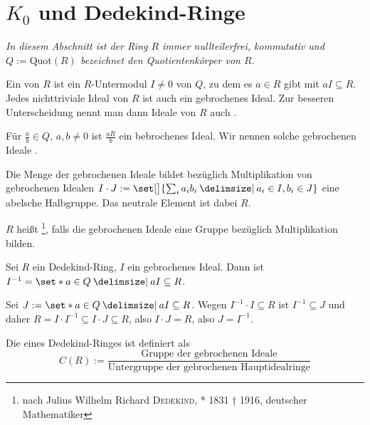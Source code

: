 \section{$K_0$ und Dedekind-Ringe} %
\label{sec:2}
\emph{In diesem Abschnitt ist der Ring $R$ immer nullteilerfrei, kommutativ und $Q := \mathrm{Quot}(R)$ bezeichnet den Quotientenkörper von $R$.}

\begin{definition}[{name=[{gebrochenes Ideal}]}]
	Ein  von $R$ ist ein $R$-Untermodul $I \neq 0$ von $Q$, zu dem es $a \in R$ gibt mit $a I \subseteq R$.
	Jedes nichttriviale Ideal von $R$ ist auch ein gebrochenes Ideal.
	Zur besseren Unterscheidung nennt man dann Ideale von $R$ auch .
	
	Für $\frac{a}{b} \in Q$, $a,b\neq 0$ ist $\frac{a R}{b}$ ein bebrochenes Ideal.
	Wir nennen solche gebrochenen Ideale .
\end{definition}

\begin{bemerkung}[{name=[{algebraische Struktur auf Menge der gebrochenen Ideale}]}]
	Die Menge der gebrochenen Ideale bildet bezüglich Multiplikation von gebrochenen Idealen $I \cdot J := \set[\big]{\sum_{i} a_i b_i \given a_i \in I, b_i \in J}$ eine abelsche Halbgruppe. 
	Das neutrale Element ist dabei $R$.
\end{bemerkung}

\begin{definition}[{name=[{Dedekind-Ring}]}]
	$R$ heißt \footnote{nach Julius Wilhelm Richard \textsc{Dedekind}, * 1831 † 1916, deutscher Mathematiker}, falls die gebrochenen Ideale eine Gruppe bezüglich Multiplikation bilden. 
\end{definition}

\begin{lemma}[{name=[Invereses eines gebrochenen Ideals]}]
	Sei $R$ ein Dedekind-Ring, $I$ ein gebrochenes Ideal.
	Dann ist $I^{-1} = \set*{a \in Q \given a I \subseteq R}$.
\end{lemma}
\begin{beweis}
	Sei $J:= \set*{a \in Q \given a I \subseteq R}$.
	Wegen $I^{-1} \cdot I \subseteq R$ ist $I^{-1} \subseteq J$ und daher $R = I \cdot I^{-1} \subseteq I \cdot J \subseteq R$, also $I \cdot J =R$, also $J=I^{-1}$.
\end{beweis}

\begin{definition}[{name=[{Klassengruppe}]}]
	Die  eines Dedekind-Ringes ist definiert als 
	\[
		C(R):=  \frac{\text{Gruppe der gebrochenen Ideale}}{\text{Untergruppe der gebrochenen Hauptidealringe}} 
	\]
\end{definition}


